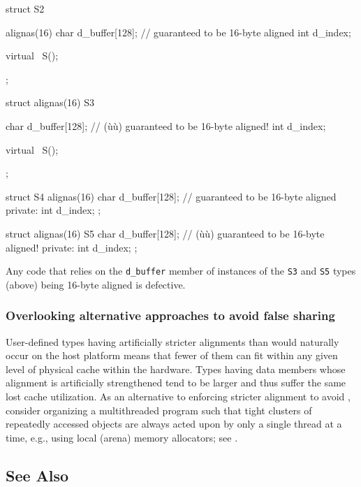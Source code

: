 \begin{emcppslisting}
struct S2 {
    alignas(16) char d_buffer[128];  // guaranteed to be 16-byte aligned
                int  d_index;

    virtual ~S();
};

struct alignas(16) S3 {
    char d_buffer[128];              // (ù{}ù) guaranteed to be 16-byte aligned!
    int  d_index;

    virtual ~S();
};

struct S4 {
    alignas(16) char d_buffer[128];  // guaranteed to be 16-byte aligned
private:
                int  d_index;
};

struct alignas(16) S5 {
    char d_buffer[128];              // (ù{}ù) guaranteed to be 16-byte aligned!
private:
    int  d_index;
};
\end{emcppslisting}

Any code that relies on the \lstinline!d_buffer! member of instances of the \lstinline!S3! and \lstinline!S5! types (above) being 16-byte aligned is defective.  

\subsubsection[Overlooking alternative approaches to avoid false sharing]{Overlooking alternative approaches to avoid false sharing}\label{stricter-alignment-might-reduce-cache-utilization}\label{overlooking-alternative-approaches-to-avoid-false-sharing}

User-defined types having artificially stricter alignments than would
naturally occur on the host platform means that fewer of them can fit
within any given level of physical cache within the hardware. Types
having data members whose alignment is artificially strengthened tend to be
larger and thus suffer the same lost cache utilization. As an
alternative to enforcing stricter alignment to avoid , consider organizing a multithreaded program such that tight
clusters of repeatedly accessed objects are always acted upon by only a
single thread at a time, e.g., using local (arena) memory allocators;
see .

\subsection[See Also]{See Also}\label{see-also}

